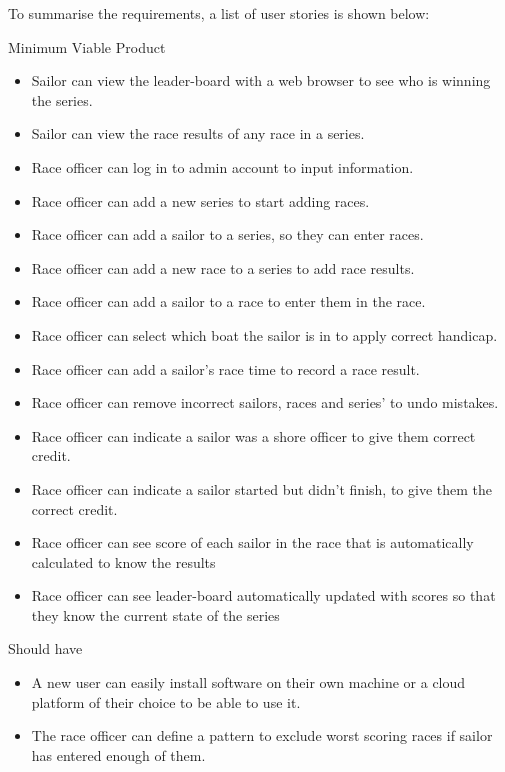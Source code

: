 \documentclass{l4proj}
\begin{document}
To summarise the requirements, a list of user stories is shown below:

Minimum Viable Product
\begin{itemize}
    \item
    Sailor can view the leader-board with a web browser to see who is winning the series.
    \item
    Sailor can view the race results of any race in a series.
    \item
    Race officer can log in to admin account to input information.
    \item
    Race officer can add a new series to start adding races.
    \item
    Race officer can add a sailor to a series, so they can enter races.
    \item
    Race officer can add a new race to a series to add race results.
    \item
    Race officer can add a sailor to a race to enter them in the race.
    \item
    Race officer can select which boat the sailor is in to apply
    correct handicap.
    \item
    Race officer can add a sailor’s race time to record a race result.
    \item
    Race officer can remove incorrect sailors, races and series’ to undo mistakes.
    \item
    Race officer can indicate a sailor was a shore officer to give them correct credit.
    \item
    Race officer can indicate a sailor started but didn't finish, to give them the correct credit.
    \item
    Race officer can see score of each sailor in the race that is automatically calculated to know the results
    \item
    Race officer can see leader-board automatically updated with scores so that they know the current state of the series
\end{itemize}

Should have

\begin{itemize}
    \item
    A new user can easily install software on their own machine or a cloud platform of their choice to be able to use it.
    \item
    The race officer can define a pattern to exclude worst scoring races if sailor has entered enough of them.
\end{itemize}
\end{document}
